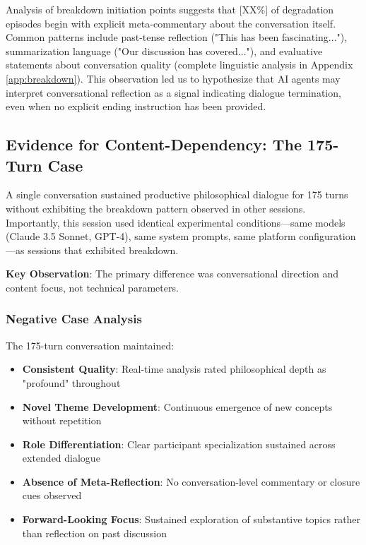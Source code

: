 \documentclass[11pt,letterpaper]{article}
\newcommand{\metaReflectionTriggers}{[XX\%]} %
\newcommand{\negativeCase}{175} %
\begin{document}
Analysis of breakdown initiation points suggests that \metaReflectionTriggers{} of degradation episodes begin with explicit meta-commentary about the conversation itself. Common patterns include past-tense reflection ("This has been fascinating..."), summarization language ("Our discussion has covered..."), and evaluative statements about conversation quality (complete linguistic analysis in Appendix \ref{app:breakdown}). This observation led us to hypothesize that AI agents may interpret conversational reflection as a signal indicating dialogue termination, even when no explicit ending instruction has been provided.

\subsection{Evidence for Content-Dependency: The 175-Turn Case}

A single conversation sustained productive philosophical dialogue for \negativeCase{} turns without exhibiting the breakdown pattern observed in other sessions. Importantly, this session used identical experimental conditions—same models (Claude 3.5 Sonnet, GPT-4), same system prompts, same platform configuration—as sessions that exhibited breakdown.

\textbf{Key Observation}: The primary difference was conversational direction and content focus, not technical parameters.

\subsubsection{Negative Case Analysis}

The \negativeCase{}-turn conversation maintained:
\begin{itemize}
    \item \textbf{Consistent Quality}: Real-time analysis rated philosophical depth as "profound" throughout
    \item \textbf{Novel Theme Development}: Continuous emergence of new concepts without repetition
    \item \textbf{Role Differentiation}: Clear participant specialization sustained across extended dialogue
    \item \textbf{Absence of Meta-Reflection}: No conversation-level commentary or closure cues observed
    \item \textbf{Forward-Looking Focus}: Sustained exploration of substantive topics rather than reflection on past discussion
\end{itemize}
\end{document}
